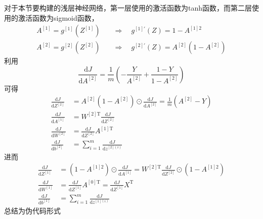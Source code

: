 \vspace{\baselineskip}
对于本节要构建的浅层神经网络，第一层使用的激活函数为tanh函数，而第二层使用的激活函数为sigmoid函数，
\begin{align}
	A^{[1]} = g^{[1]}(Z^{[1]}) &\quad \Rightarrow \quad g^{[1]'}(Z) = 1-A^{[1]2} \\
	A^{[2]} = g^{[2]}(Z^{[2]}) &\quad \Rightarrow \quad g^{[2]'}(Z) = A^{[2]}(1-A^{[2]})
\end{align}
利用
\begin{equation}
	\frac{\mathrm{d}J}{\mathrm{d}A^{[2]}} 
	= \frac{1}{m} \left(-\frac{Y}{A^{[2]}} + \frac{1 - Y}{1 - A^{[2]}}\right)
\end{equation}
可得
\begin{align}
	\frac{\mathrm{d}J}{\mathrm{d}Z^{[2]}} &= A^{[2]}(1-A^{[2]}) \odot \frac{\mathrm{d}J}{\mathrm{d}A^{[2]}} = \frac{1}{m}(A^{[2]}-Y) \\
	\frac{\mathrm{d}J}{\mathrm{d}A^{[1]}} &= W^{[2] \mathrm{T}} \frac{\mathrm{d}J}{\mathrm{d}Z^{[2]}} \\
	\frac{\mathrm{d}J}{\mathrm{d}W^{[2]}} &= \frac{\mathrm{d}J}{\mathrm{d}Z^{[2]}} A^{[1] \mathrm{T}} \\
	\frac{\mathrm{d}J}{\mathrm{d}b^{[2]}} &= \sum_{i=1}^{m} \frac{\mathrm{d}J}{\mathrm{d}z^{[2](i)}}
\end{align}
进而
\begin{align}
	\frac{\mathrm{d}J}{\mathrm{d}Z^{[1]}} &= (1-A^{[1]2}) \odot \frac{\mathrm{d}J}{\mathrm{d}A^{[1]}} = W^{[2] \mathrm{T}} \frac{\mathrm{d}J}{\mathrm{d}Z^{[2]}} \odot (1-A^{[1]2}) \\
	\frac{\mathrm{d}J}{\mathrm{d}W^{[1]}} &= \frac{\mathrm{d}J}{\mathrm{d}Z^{[1]}} A^{[0] \mathrm{T}} = \frac{\mathrm{d}J}{\mathrm{d}Z^{[1]}} X^{\mathrm{T}} \\
	\frac{\mathrm{d}J}{\mathrm{d}b^{[1]}} &= \sum_{i=1}^{m} \frac{\mathrm{d}J}{\mathrm{d}z^{[1](i)}}
\end{align}
总结为伪代码形式
